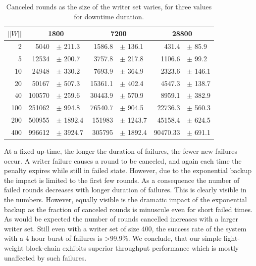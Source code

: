 \documentclass[10pt]{article}
\begin{document}
\begin{table}[b]
\centering
\begin{tabular}{@{}rrlrlrl@{}}
\toprule
\multicolumn{1}{c}{$||W||$} & \multicolumn{2}{c}{1800} & \multicolumn{2}{c}{7200} & \multicolumn{2}{c}{28800} \\
\midrule
2       &  5040   &$\pm$  211.3      & 1586.8  & $\pm$ 136.1    & 431.4    & $\pm$ 85.9              \\
5      & 12534   & $\pm$ 200.7        & 3757.8   & $\pm$ 217.8   & 1106.6      & $\pm$ 99.2     \\
10     & 24948 & $\pm$ 330.2          & 7693.9 & $\pm$ 364.9     & 2323.6   & $\pm$ 146.1 \\
20      & 50167     & $\pm$ 507.3        & 15361.1 & $\pm$ 402.4     & 4547.3  & $\pm$ 138.7 \\
40     & 100570   & $\pm$ 259.6       & 30443.9 & $\pm$ 570.9    & 8959.1      & $\pm$ 382.9         \\
100      & 251062     &  $\pm$ 994.8          & 76540.7   & $\pm$ 904.5   & 22736.3  & $\pm$ 560.3 \\
200     &  500955   &  $\pm$ 1892.4          & 151983 & $\pm$ 1243.7   & 45158.4    & $\pm$ 624.5                    \\ 
400   &  996612   &  $\pm$ 3924.7        & 305795      & $\pm$ 1892.4    & 90470.33      & $\pm$ 691.1                   \\
\bottomrule
\end{tabular}
\caption{Canceled rounds as the size of the writer set varies, for three values for downtime duration.}
\label{table:one}
\end{table}

At a fixed up-time, the longer the duration of failures, the fewer new failures occur. A writer failure causes a round to be canceled, and again each time the penalty expires while still in failed state. However, due to the exponential backup the impact is limited to the first few rounds. As a consequence the number of failed rounds decreases with longer duration of failures. This is clearly visible in the numbers. However, equally visible is the dramatic impact of the exponential backup as the fraction of canceled rounds is minuscule even for short failed times. As would be expected the number of  rounds cancelled increases with a larger writer set. Still even with a writer set of size 400, the success rate of the system with a 4 hour burst of failures is >99.9\%.
We conclude, that our simple light-weight block-chain exhibits superior throughput performance which is mostly unaffected by such failures.
\end{document}
